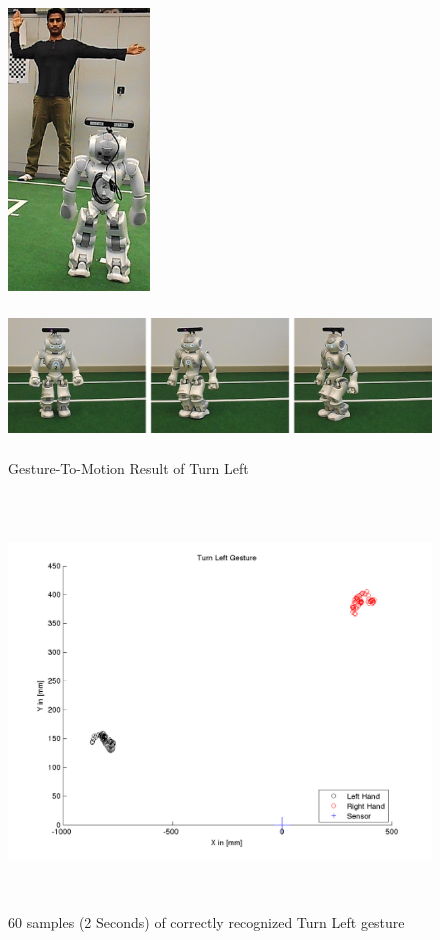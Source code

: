\begin{figure}
	[h] 
	\begin{minipage}
		{1 
		\textwidth} \centering 
		\includegraphics[height=75mm]{figures/result/usr-turn-left.jpg} \caption*{} 
	\end{minipage}
	\begin{minipage}
		{1 
		\textwidth} 
		\includegraphics[height=42mm]{figures/result/nao-gm-turn-left.jpg} 
	\end{minipage}
	\caption{Gesture-To-Motion Result of Turn Left} \label{res:gm:turn:left} 
\end{figure}

\begin{figure}
	[h] \centering 
	\includegraphics[height=110mm]{figures/result/test-turn-left.jpg} \caption{60 samples (2 Seconds) of correctly recognized Turn Left gesture} 
	\label{res:pl:turn:left}
\end{figure}

